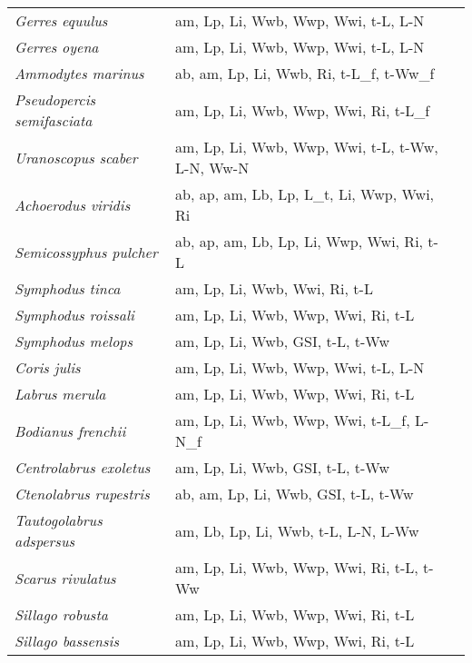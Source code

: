 {\begin{longtable}[c]{p{3.5cm}p{5.5cm}p{5.5cm}}
\emph{Gerres equulus} &  am, Lp, Li, Wwb, Wwp, Wwi, t-L, L-N & \citet{IqbaSuzu2008,IqbaMasu2006} \\
\emph{Gerres oyena} &  am, Lp, Li, Wwb, Wwp, Wwi, t-L, L-N & \citet{KanaTach2006,LamtPrat2007} \\
\emph{Ammodytes marinus} &  ab, am, Lp, Li, Wwb, Ri, t-L\_f, t-Ww\_f & \citet{RegnGibb2018,BoelClar2017,BergHoin2002} \\
\emph{Pseudopercis semifasciata} &  am, Lp, Li, Wwb, Wwp, Wwi, Ri, t-L\_f & \citet{Gonz2006} \\
\emph{Uranoscopus scaber} &  am, Lp, Li, Wwb, Wwp, Wwi, t-L, t-Ww, L-N, Ww-N & \citet{CokeAkyo2008,DemiCan2007} \\
\emph{Achoerodus viridis} &  ab, ap, am, Lb, Lp, L\_t, Li, Wwp, Wwi, Ri & \citet{Gill1995,Jeff2003} \\
\emph{Semicossyphus pulcher} &  ab, ap, am, Lb, Lp, Li, Wwp, Wwi, Ri, t-L & \citet{JirsDraw2007,AlonKey2004} \\
\emph{Symphodus tinca} &  am, Lp, Li, Wwb, Wwi, Ri, t-L & \citet{BougDerb2015,GordMoli2000} \\
\emph{Symphodus roissali} &  am, Lp, Li, Wwb, Wwp, Wwi, Ri, t-L & \citet{RavePlan2009,GordMoli2000,JirsDraw2007} \\
\emph{Symphodus melops} &  am, Lp, Li, Wwb, GSI, t-L, t-Ww & \citet{SayeGibs1996} \\
\emph{Coris julis} &  am, Lp, Li, Wwb, Wwp, Wwi, t-L, L-N & \citet{AlonAlos2014,GordMoli2000} \\
\emph{Labrus merula} &  am, Lp, Li, Wwb, Wwp, Wwi, Ri, t-L & \citet{DulcKozu1999,GordMoli2000} \\
\emph{Bodianus frenchii} &  am, Lp, Li, Wwb, Wwp, Wwi, t-L\_f, L-N\_f & \citet{CossHesp2010} \\
\emph{Centrolabrus exoletus} &  am, Lp, Li, Wwb, GSI, t-L, t-Ww & \citet{SayeGibs1996} \\
\emph{Ctenolabrus rupestris} &  ab, am, Lp, Li, Wwb, GSI, t-L, t-Ww & \citet{SayeGibs1995} \\
\emph{Tautogolabrus adspersus} &  am, Lb, Lp, Li, Wwb, t-L, L-N, L-Ww & \citet{SercCole1974,NitsMath2001} \\
\emph{Scarus rivulatus} &  am, Lp, Li, Wwb, Wwp, Wwi, Ri, t-L, t-Ww & \citet{Lou1993} \\
\emph{Sillago robusta} &  am, Lp, Li, Wwb, Wwp, Wwi, Ri, t-L & \citet{HyndPott1996} \\
\emph{Sillago bassensis} &  am, Lp, Li, Wwb, Wwp, Wwi, Ri, t-L & \citet{HyndPott1996} \\

\end{longtable}}
